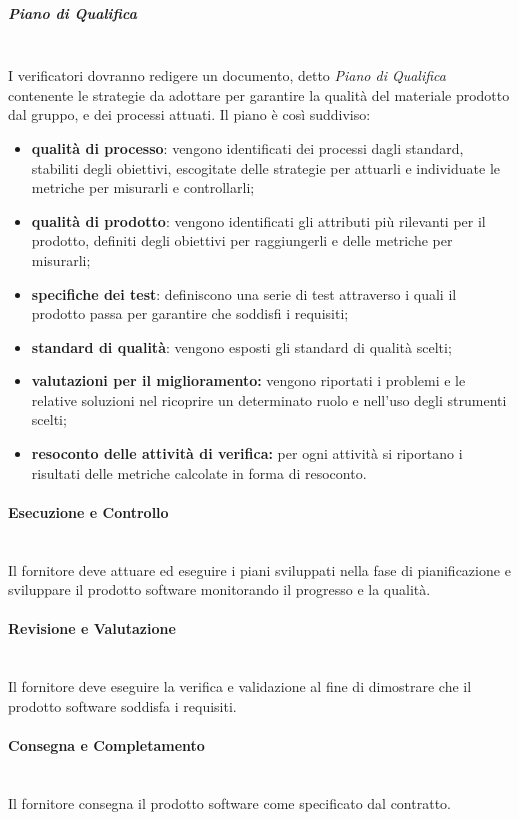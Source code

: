 			\subparagraph{Piano di Qualifica} \mbox{}\\
			
			\noindent I verificatori dovranno redigere un documento, detto \textit{Piano di 
				Qualifica} contenente le strategie da adottare per garantire la qualità del 
			materiale prodotto dal gruppo, e dei processi attuati. Il piano è così 
			suddiviso:
			\begin{itemize}
				\item \textbf{qualità di processo}: vengono identificati dei processi dagli 
				standard, stabiliti degli obiettivi, escogitate delle strategie per 
				attuarli e 			
				individuate le metriche per misurarli e controllarli;
				\item \textbf{qualità di prodotto}: vengono identificati gli attributi più 
				rilevanti per il prodotto, definiti degli obiettivi per raggiungerli e 
				delle 
				metriche per misurarli;
				\item \textbf{specifiche dei test}: definiscono una serie di test 
				attraverso 
				i quali il prodotto passa per garantire che soddisfi i requisiti;
				\item \textbf{standard di qualità}: vengono esposti gli standard di qualità 
				scelti;
				\item \textbf{valutazioni per il miglioramento:} vengono riportati i 
				problemi 
				e le relative soluzioni nel ricoprire un determinato ruolo e nell'uso degli 
				strumenti scelti;
				\item \textbf{resoconto delle attività di verifica:} per ogni attività si 
				riportano i risultati delle metriche calcolate in forma di resoconto.
			\end{itemize}

		\paragraph{Esecuzione e Controllo} \mbox{}\\
		Il fornitore deve attuare ed eseguire i piani sviluppati nella fase di 
		pianificazione e sviluppare il prodotto software monitorando il progresso e la 
		qualità.
		\paragraph{Revisione e Valutazione} \mbox{}\\
		Il fornitore deve eseguire la verifica e validazione al fine di dimostrare che 
		il prodotto software soddisfa i requisiti.
		\paragraph{Consegna e Completamento} \mbox{}\\
		Il fornitore consegna il prodotto software come specificato dal contratto.	

